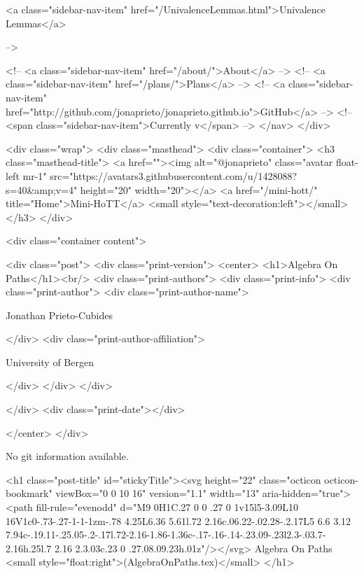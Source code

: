           <a class="sidebar-nav-item" href="/UnivalenceLemmas.html">Univalence Lemmas</a>
        
      
     -->

    <!-- <a class="sidebar-nav-item" href="/about/">About</a> -->
    <!-- <a class="sidebar-nav-item" href="/plans/">Plans</a> -->
    <!-- <a class="sidebar-nav-item" href="http://github.com/jonaprieto/jonaprieto.github.io">GitHub</a> -->
    <!-- <span class="sidebar-nav-item">Currently v</span> -->
  </nav>
</div>

    <div class="wrap">
      <div class="masthead">
        <div class="container">
          <h3 class="masthead-title">
            <a href=""><img alt="@jonaprieto" class="avatar float-left mr-1" src="https://avatars3.githubusercontent.com/u/1428088?s=40&amp;v=4" height="20" width="20"></a>
            <a href="/mini-hott/" title="Home">Mini-HoTT</a>
            <small style="text-decoration:left"></small>
          </h3>
        </div>
      
      <div class="container content">
        







<div class="post">
  <div class="print-version">
    <center>
      <h1>Algebra On Paths</h1><br/>
        <div class="print-authors">
          <div class="print-info">
            <div class="print-author">
              <div class="print-author-name">
                
                  Jonathan Prieto-Cubides
                
              </div>
              <div class="print-author-affiliation">
                
                  University of Bergen
                
                </div>
            </div>
          </div>
          
          
        </div>
        <div class="print-date"></div>
        
        
    </center>
  </div>

  
  No git information available.
  

  <h1 class="post-title" id="stickyTitle"><svg height="22" class="octicon octicon-bookmark" viewBox="0 0 10 16" version="1.1" width="13" aria-hidden="true"><path fill-rule="evenodd" d="M9 0H1C.27 0 0 .27 0 1v15l5-3.09L10 16V1c0-.73-.27-1-1-1zm-.78 4.25L6.36 5.61l.72 2.16c.06.22-.02.28-.2.17L5 6.6 3.12 7.94c-.19.11-.25.05-.2-.17l.72-2.16-1.86-1.36c-.17-.16-.14-.23.09-.23l2.3-.03.7-2.16h.25l.7 2.16 2.3.03c.23 0 .27.08.09.23h.01z"/></svg> Algebra On Paths <small style="float:right">(AlgebraOnPaths.tex)</small>
  </h1>

